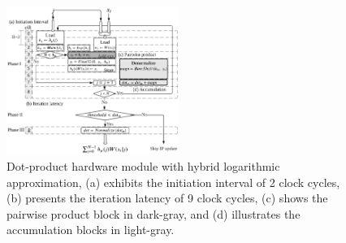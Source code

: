 \begin{figure}[t!]
	\centering
	\includegraphics[width=0.5\textwidth]{../figures/dot_product_log.pdf}
	\caption{Dot-product hardware module with hybrid logarithmic approximation, (a) exhibits the initiation interval of 2 clock cycles, (b) presents the iteration latency of 9 clock cycles, (c) shows the pairwise product block in dark-gray, and (d) illustrates the accumulation blocks in light-gray.}
	\label{fig:dot_product_log}
\end{figure}


